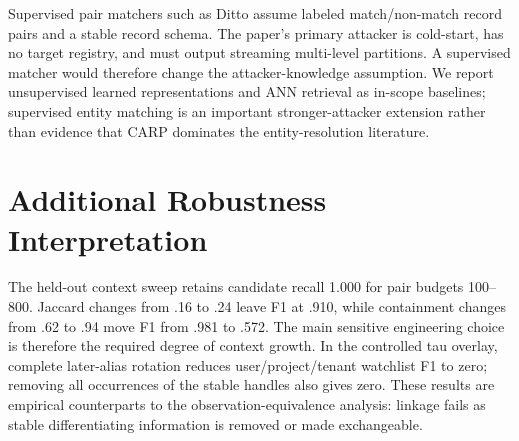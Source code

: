 \documentclass[letterpaper]{article} %
\begin{document}
Supervised pair matchers such as Ditto assume labeled match/non-match record pairs and a stable
record schema. The paper's primary attacker is cold-start, has no target registry, and must output
streaming multi-level partitions. A supervised matcher would therefore change the attacker-knowledge
assumption. We report unsupervised learned representations and ANN retrieval as in-scope baselines;
supervised entity matching is an important stronger-attacker extension rather than evidence that
CARP dominates the entity-resolution literature.

\section{Additional Robustness Interpretation}

The held-out context sweep retains candidate recall 1.000 for pair budgets 100--800. Jaccard changes
from .16 to .24 leave F1 at .910, while containment changes from .62 to .94 move F1 from .981 to
.572. The main sensitive engineering choice is therefore the required degree of context growth.
In the controlled tau overlay, complete later-alias rotation reduces user/project/tenant watchlist F1
to zero; removing all occurrences of the stable handles also gives zero. These results are empirical
counterparts to the observation-equivalence analysis: linkage fails as stable differentiating
information is removed or made exchangeable.
\end{document}
